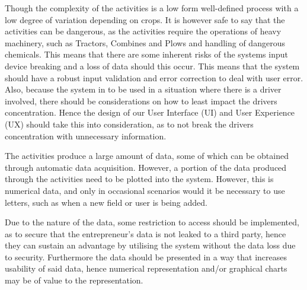Though the complexity of the activities is a low form well-defined process with a low degree of variation depending on crops. It is however safe to say that the activities can be dangerous, as the activities require the operations of heavy machinery, such as Tractors, Combines and Plows and handling of dangerous chemicals. This means that there are some inherent risks of the systems input device breaking and a loss of data should this occur. This means that the system should have a robust  input validation and error correction to deal with user error. Also, because the system in to be used in a situation where there is a driver involved, there should be considerations on how to least impact the drivers concentration. Hence the design of our User Interface (UI) and User Experience (UX) should take this into consideration, as to not break the drivers concentration with unnecessary information.

The activities produce a large amount of data, some of which can be obtained through automatic data acquisition. However, a portion of the data produced through the activities need to be plotted into the system. However, this is numerical data, and only in occasional scenarios would it be necessary to use letters, such as when a new field or user is being added. 

Due to the nature of the data, some restriction to access should be implemented, as to secure that the entrepreneur's data is not leaked to a third party, hence they can sustain an advantage by utilising the system without the data loss due to security. Furthermore the data should be presented in a way that increases usability of said data, hence numerical representation and/or graphical charts may be of value to the representation.

